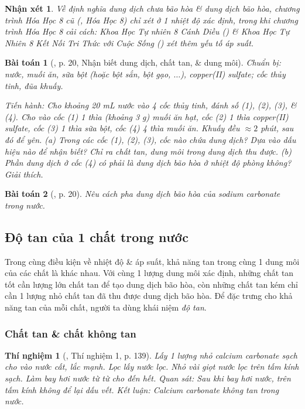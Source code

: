 \documentclass{article}
\newtheorem{baitoan}{Bài toán}
\newtheorem{nhanxet}{Nhận xét}
\newtheorem{thinghiem}{Thí nghiệm}
\begin{document}
\begin{nhanxet}
	Về định nghĩa dung dịch chưa bão hòa \& dung dịch bão hòa, chương trình Hóa Học 8 cũ (\cite{SGK_Hoa_Hoc_8}, Hóa Học 8) chỉ xét ở 1 nhiệt độ xác định, trong khi chương trình Hóa Học 8 cải cách: Khoa Học Tự nhiên 8 Cánh Diều (\cite{SGK_KHTN_8_Canh_Dieu}) \& Khoa Học Tự Nhiên 8 Kết Nối Tri Thức với Cuộc Sống (\cite{SGK_KHTN_8_KNTTVCS}) xét thêm yếu tố áp suất.
\end{nhanxet}

\begin{baitoan}[\cite{SGK_KHTN_8_KNTTVCS}, p. 20, Nhận biết dung dịch, chất tan, \& dung môi]
	\emph{Chuẩn bị:} nước, muối ăn, sữa bột (hoặc bột sắn, bột gạo, $\ldots$), copper(II) sulfate; cốc thủy tinh, đũa khuấy.
	
	\emph{Tiến hành:} Cho khoảng \emph{20 mL} nước vào 4 cốc thủy tinh, đánh số (1), (2), (3), \& (4). Cho vào cốc (1) 1 thìa (khoảng \emph{3 g}) muối ăn hạt, cốc (2) 1 thìa copper(II) sulfate, cốc (3) 1 thìa sữa bột, cốc (4) 4 thìa muối ăn. Khuấy đều $\approx2$ phút, sau đó để yên. (a) Trong các cốc (1), (2), (3), cốc nào chứa dung dịch? Dựa vào dấu hiệu nào để nhận biết? Chỉ ra chất tan, dung môi trong dung dịch thu được. (b) Phần dung dịch ở cốc (4) có phải là dung dịch bão hòa ở nhiệt độ phòng không? Giải thích.
\end{baitoan}

\begin{baitoan}[\cite{SGK_KHTN_8_KNTTVCS}, p. 20]
	Nêu cách pha dung dịch bão hòa của sodium carbonate \emph{} trong nước.
\end{baitoan}

\subsection{Độ tan của 1 chất trong nước}
Trong cùng điều kiện về nhiệt độ \& áp suất, khả năng tan trong cùng 1 dung môi của các chất là khác nhau. Với cùng 1 lượng dung môi xác định, những chất tan tốt cần lượng lớn chất tan để tạo dung dịch bão hòa, còn những chất tan kém chỉ cần 1 lượng nhỏ chất tan đã thu được dung dịch bão hòa. Để đặc trưng cho khả năng tan của mỗi chất, người ta dùng khái niệm \textit{độ tan}.

\subsubsection{Chất tan \& chất không tan}

\begin{thinghiem}[\cite{SGK_Hoa_Hoc_8}, Thí nghiệm 1, p. 139]
	Lấy 1 lượng nhỏ calcium carbonate sạch \emph{} cho vào nước cất, lắc mạnh. Lọc lấy nước lọc. Nhỏ vài giọt nước lọc trên tấm kính sạch. Làm bay hơi nước từ từ cho đến hết. \emph{Quan sát:} Sau khi bay hơi nước, trên tấm kính không để lại dấu vết. \emph{Kết luận:} Calcium carbonate không tan trong nước.
\end{thinghiem}
\end{document}

